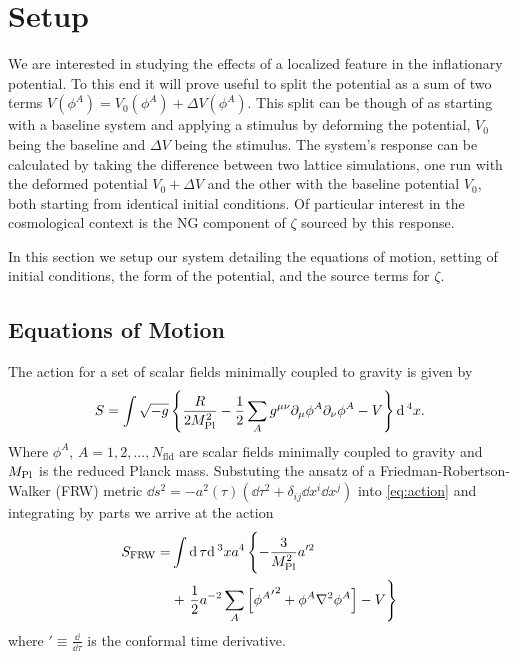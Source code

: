 
\section{Setup} \label{sec:setup}
We are interested in studying the effects of a localized feature in the inflationary potential.
To this end it will prove useful to split the potential as a sum of two terms $V(\phi^A) = V_0(\phi^A) + \Delta V(\phi^A)$.
This split can be though of as starting with a baseline system and applying a stimulus by deforming the potential, $V_0$ being the baseline and $\Delta V$ being the stimulus.
The system's response can be calculated by taking the difference between two lattice simulations, one run with the deformed potential $V_0+\Delta V$ and the other with the baseline potential $V_0$, both starting from identical initial conditions.
Of particular interest in the cosmological context is the NG component of $\zeta$ sourced by this response.

In this section we setup our system detailing the equations of motion, setting of initial conditions, the form of the potential, and the source terms for $\zeta$.

\subsection{Equations of Motion}

The action for a set of scalar fields minimally coupled to gravity is given by
\begin{equation} \label{eq:action}
  S = \int \sqrt{-g}\left\{\frac{R}{2M_{\mathrm{Pl}}^2} - \frac{1}{2}\sum_Ag^{\mu\nu}\partial_\mu\phi^A\partial_\nu\phi^A - V \right\}\mathrm{d}\,^4x.
\end{equation}
Where $\phi^A$, $A=1,2,...,N_\mathrm{fld}$ are scalar fields minimally coupled to gravity and $M_{\mathrm{Pl}}$ is the reduced Planck mass. 
Substuting the ansatz of a Friedman-Robertson-Walker (FRW) metric $\dd s^2 = -a^2(\tau)\left( \dd\tau^2 + \delta_{ij}\dd x^i\dd x^j \right)$ into \eqref{eq:action} and integrating by parts we arrive at the action
\begin{align} \label{eq:actionFRW}
  \begin{split}
    S_{\mathrm{FRW}} = &\int \dd\tau\dd^3xa^4\left\{
    - \frac{3}{\mpl^2}a'^2 \vphantom{\sum_A}\right. \\
    & + \left.\frac{1}{2}a^{-2}\sum_A\left[{{\phi^A}'}^2
      + \phi^A\nabla^2\phi^A\right] %
      - V \right\}
    \end{split}
\end{align}
where ${}' \equiv \frac{\dd}{\dd\tau}$ is the conformal time derivative.

